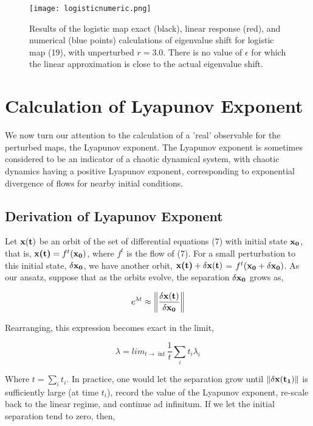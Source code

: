 \documentclass[pre,aps,twocolumn,showpacs,hyperref]{revtex4-1} %
\begin{document}
\begin{figure}[t]
\begin{centering}
\texttt{[image: logisticnumeric.png]}

\caption{Results of the logistic map exact (black), linear response (red), and numerical (blue points) calculations of eigenvalue shift for logistic map (19), with unperturbed $r=3.0$. There is no value of $\epsilon$ for which the linear approximation is close to the actual eigenvalue shift.}

\end{centering}
\end{figure}

\section{Calculation of Lyapunov Exponent}
We now turn our attention to the calculation of a 'real' observable for the perturbed maps, the Lyapunov exponent. The Lyapunov exponent is sometimes considered to be an indicator of a chaotic dynamical system, with chaotic dynamics having a positive Lyapunov exponent, corresponding to exponential divergence of flows for nearby initial conditions.

\subsection{Derivation of Lyapunov Exponent}
Let $\bf x(t)$ be an orbit of the set of differential equations (7) with initial state $\bf x_{0}$, that is, $\textbf{x(t)} = f^{t}(\textbf{$\bf x_0$})$, where $f^t$ is the flow of (7). For a small perturbation to this initial state, $\bf \delta x_{0}$, we have another orbit, $\textbf{x(t)} + \textbf{$\bf \delta x(t)$}$ = $f^{t}(\textbf{$\bf x_{0}$} + \textbf{$\bf \delta x_{0}$})$. As our ansatz, suppose that as the orbits evolve, the separation $\bf \delta x_{0}$ grows as,

\begin{equation}
e^{\lambda t} \approx \left\Vert \frac{\bf \delta x(t)}{\bf \delta x_{0}} \right\Vert
\end{equation}

Rearranging, this expression becomes exact in the limit,

\begin{equation}
\lambda = lim_{t\rightarrow \inf} \frac{1}{t} \sum_{i} t_{i} \lambda_{i}
\end{equation}

Where $t = \sum_{i} t_{i}$. In practice, one would let the separation grow until $\Vert \bf \delta x(t_{1}) \Vert$ is sufficiently large (at time $t_{i}$), record the value of the Lyapunov exponent, re-scale back to the linear regime, and continue ad infinitum.
\indent If we let the initial separation tend to zero, then,
\end{document}
